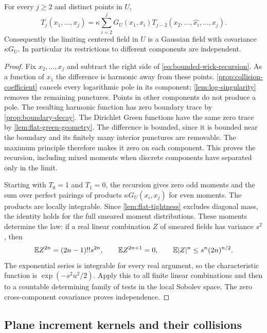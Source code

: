 \begin{proposition}
\label{prop:gaussian-moments}
For every $j\geq2$ and distinct points in $U$,
\begin{equation}
 T_j(x_1,\ldots,x_j)
 =\kappa\sum_{i=2}^j G_U(x_1,x_i)
          T_{j-2}(x_2,\ldots,\widehat{x_i},\ldots,x_j).
 \label{eq:bounded-wick-recursion}
\end{equation}
Consequently the limiting centered field in $U$ is a Gaussian
field with covariance $\kappa G_U$. In particular its restrictions
to different components are independent.

\end{proposition}

\begin{proof}
Fix $x_2,\ldots,x_j$ and subtract the right side of
\eqref{eq:bounded-wick-recursion}. As a function of $x_1$ the
difference is harmonic away from these points.
\cref{prop:collision-coefficient} cancels every logarithmic pole
in its component; \cref{lem:log-singularity} removes the remaining
punctures. Points in other components do not produce a pole.
The resulting harmonic function has zero boundary trace by
\cref{prop:boundary-decay}. The Dirichlet Green functions have
the same zero trace by \cref{lem:flat-green-geometry}. The difference is
bounded, since it is bounded near the boundary and its finitely
many interior punctures are removable. The maximum principle
therefore makes it zero on each component. This proves the
recursion, including mixed moments when discrete components
have separated only in the limit.

Starting with $T_0=1$ and $T_1=0$, the recursion gives zero odd
moments and the sum over perfect pairings of products
$\kappa G_U(x_i,x_j)$ for even moments. The products are locally
integrable. Since \cref{lem:flat-tightness} excludes diagonal mass,
the identity holds for the full smeared moment distributions.
These moments determine the law: if a real linear combination
$Z$ of smeared fields has variance $s^2$, then
\[
 \mathbb E Z^{2n}=(2n-1)!!s^{2n},\qquad
 \mathbb E Z^{2n+1}=0,\qquad
 \mathbb E|Z|^n\leq s^n(2n)^{n/2}.
\]
The exponential series is integrable for every real argument,
so the characteristic function is $\exp(-s^2u^2/2)$.
Apply this to all finite linear combinations and then to a
countable determining family of tests in the local Sobolev space.
The zero cross-component covariance proves independence.
\end{proof}

\subsection{Plane increment kernels and their collisions}

